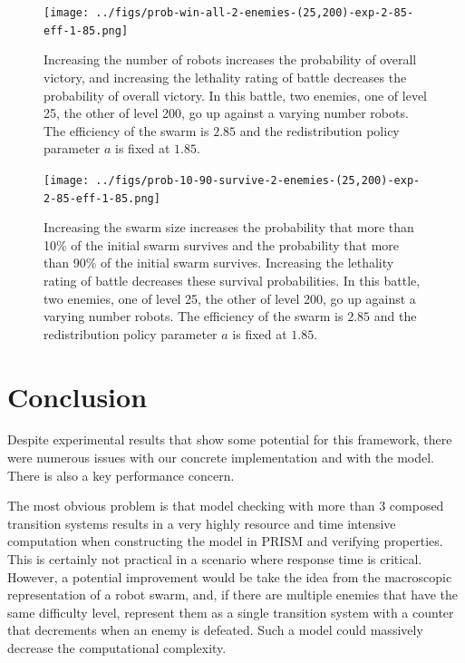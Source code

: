 \documentclass[11pt]{article}
\theoremstyle{definition}
\begin{document}
\begin{figure}
    \begin{center}
        \texttt{[image: ../figs/prob-win-all-2-enemies-(25,200)-exp-2-85-eff-1-85.png]}
    \end{center}
    \caption{
        Increasing the number of robots increases the probability of overall
        victory, and increasing the lethality rating of battle decreases the
        probability of overall victory.
        In this battle, two enemies, one of level 25, the other of level 200,
        go up against a varying number robots.
        The efficiency of the swarm is $2.85$ and the redistribution policy
        parameter $a$ is fixed at $1.85$.
    }
    \label{fig:surface}
\end{figure}

\begin{figure}
    \begin{center}
        \texttt{[image: ../figs/prob-10-90-survive-2-enemies-(25,200)-exp-2-85-eff-1-85.png]}
    \end{center}
    \caption{
        Increasing the swarm size increases the probability that more than 10\%
        of the initial swarm survives and the probability that more than 90\%
        of the initial swarm survives.
        Increasing the lethality rating of battle decreases these survival
        probabilities.
        In this battle, two enemies, one of level 25, the other of level 200,
        go up against a varying number robots.
        The efficiency of the swarm is $2.85$ and the redistribution policy
        parameter $a$ is fixed at $1.85$.
    }
    \label{fig:surface-2}
\end{figure}

\section{Conclusion}
\label{sec:conclusion}

Despite experimental results that show some potential for this framework,
there were numerous issues with our concrete implementation
and with the model. There is also a key performance concern.

The most obvious problem is that model checking
with more than 3 composed transition systems results
in a very highly resource and time intensive computation
when constructing the model in PRISM and verifying
properties. This is certainly not practical in a
scenario where response time is critical. However,
a potential improvement would be take the idea from
the macroscopic representation of a robot swarm,
and, if there are multiple enemies that have the same
difficulty level, represent them as a single transition
system with a counter that decrements when
an enemy is defeated. Such a model
could massively decrease the computational
complexity.
\end{document}

